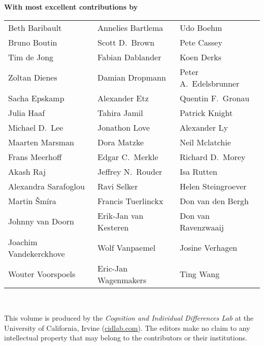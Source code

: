 \newcommand{\isymb}{$\cdot$}

\noindent\textbf{With most excellent contributions by}\\[3ex]
\noindent\begin{tabular}{p{2.1in}p{2.1in}p{2.1in}}
	Beth Baribault        & Annelies Bartlema     & Udo Boehm              \\[.5ex]
	Bruno Boutin          & Scott D.\ Brown       & Pete Cassey            \\[.5ex]
	Tim de Jong           & Fabian Dablander      & Koen Derks             \\[.5ex]
	Zoltan Dienes         & Damian Dropmann       & Peter A.\ Edelsbrunner \\[.5ex]
	Sacha Epskamp         & Alexander Etz         & Quentin F.\ Gronau     \\[.5ex]
	Julia Haaf            & Tahira Jamil          & Patrick Knight         \\[.5ex]
	Michael D.\ Lee       & Jonathon Love         & Alexander Ly           \\[.5ex]
	Maarten Marsman       & Dora Matzke           & Neil Mclatchie         \\[.5ex]
	Frans Meerhoff        & Edgar C.\ Merkle      & Richard D.\ Morey      \\[.5ex]
	Akash Raj             & Jeffrey N.\ Rouder    & Isa Rutten             \\[.5ex]
	Alexandra Sarafoglou  & Ravi Selker           & Helen Steingroever     \\[.5ex]
	Martin \v{S}m\'{i}ra  & Francis Tuerlinckx    & Don van den Bergh      \\[.5ex]
	Johnny van Doorn      & Erik-Jan van Kesteren & Don van Ravenzwaaij    \\[.5ex]
	Joachim Vandekerckhove & Wolf Vanpaemel        & Josine Verhagen        \\[.5ex]
	Wouter Voorspoels      & Eric-Jan Wagenmakers  & Ting Wang              \\
\end{tabular}\\

\vfill

{
\noindent This volume is produced by the \textit{Cognition and Individual Differences Lab} at the 
University of California, Irvine (\url{cidlab.com}). The editors make no claim to any intellectual property that may belong to the contributors or their institutions.
}

